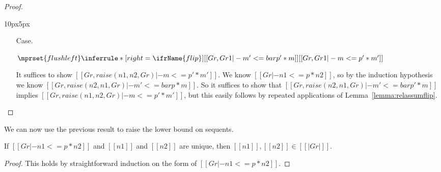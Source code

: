 \begin{proof}
\begin{changemargin}{10px}{5px}
\begin{itemize}
    \item[Case.]\ \\ 
      \begin{center}
        \begin{math}
          $$\mprset{flushleft}
          \inferrule* [right=\ifrName{flip}] {
            [[Gr,Gr1 |- m' <= bar p' * m]]
          }{[[Gr,Gr1 |- m <= p' * m']]}
        \end{math}
      \end{center}
      It suffices to show $[[Gr,raise(n1,n2,Gr) |- m <= p' * m']]$.  We know $[[Gr |- n1 <=p* n2]]$, so by 
      the induction hypothesis we know $[[Gr,raise(n2,n1,Gr) |- m' <= bar p * m]]$.  So it suffices to show that 
      $[[Gr,raise(n2,n1,Gr) |- m' <= bar p' * m]]$ implies
      $[[Gr,raise(n1,n2,Gr) |- m <= p' * m']]$, but this easily follows by repeated applications of Lemma~\ref{lemma:relassumflip}.
    \end{itemize}
    \end{changemargin}
  \end{proof}
\noindent
We can now use the previous result to raise the lower bound on sequents.
\begin{lemma}
  \label{lemma:graph_node_containment}
  If $[[Gr |- n1 <=p * n2]]$ and $[[n1]]$ and $[[n2]]$ are unique, then
  $[[n1]],[[n2]] \in [[| Gr |]]$.
\end{lemma}
\begin{proof}
  This holds by straightforward induction on the form of $[[Gr |- n1 <=p * n2]]$.
\end{proof}

